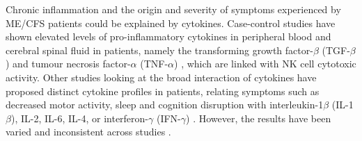Chronic inflammation and the origin and severity of symptoms experienced by ME/CFS patients could be explained by cytokines.
Case-control studies have shown elevated levels of pro-inflammatory cytokines in peripheral blood and cerebral spinal fluid in patients, namely the transforming growth factor-${\beta}$ (TGF-${\beta}$) \citep{montoyaCytokineSignatureAssociated2017} and tumour necrosis factor-${\alpha}$ (TNF-${\alpha}$) \citep{brenuImmunologicalAbnormalitiesPotential2011}, which are linked with NK cell cytotoxic activity.
Other studies looking at the broad interaction of cytokines have proposed distinct cytokine profiles in patients, relating symptoms such as decreased motor activity, sleep and cognition disruption with interleukin-1${\beta}$ (IL-1${\beta}$), IL-2, IL-6, IL-4, or interferon-${\gamma}$ (IFN-${\gamma}$) \citep{broderick2010FormalAnalysis}.
However, the results have been varied and inconsistent across studies \citep{patarca2001CytokinesChronic, natelson2002EvidencePresence, tomoda2005CytokineProduction, blundell2015ChronicFatigue}.


